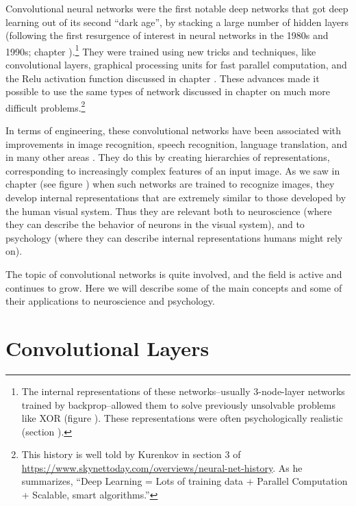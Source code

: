 Convolutional neural networks were the first notable deep networks that got deep learning out of its second ``dark age'', by stacking a large number of hidden layers (following the first resurgence of interest in neural networks in the 1980s and 1990s; chapter ).\footnote{The internal representations of these networks--usually 3-node-layer networks trained by backprop--allowed them to solve previously unsolvable problems like XOR (figure ). These representations were often psychologically realistic (section ).} They were trained using new tricks and techniques, like convolutional layers, graphical processing units for fast parallel computation, and the Relu activation function discussed in chapter . These advances made it possible to use the same types of network discussed in chapter  on much more difficult problems.\footnote{This history is well told by Kurenkov in section 3 of \url{https://www.skynettoday.com/overviews/neural-net-history}. As he summarizes, ``Deep Learning = Lots of training data + Parallel Computation + Scalable, smart algorithms.''}

In terms of engineering, these convolutional networks have been associated with improvements in image recognition, speech recognition, language translation, and in many other areas \cite{lecun2015deep, goodfellow2016deep}. They do this by creating hierarchies of representations, corresponding  to increasingly complex features of an input image. As we saw in chapter  (see figure ) when such networks are trained to recognize images, they develop internal representations that are extremely similar to those developed by the human visual  system. Thus they are relevant both to neuroscience (where they can describe the behavior of neurons in the visual system), and to psychology (where they can describe internal representations humans might rely on).

The topic of convolutional networks is quite involved, and the field is active and continues to grow. Here we will describe some of the main concepts and some of their applications to neuroscience and psychology.

\section{Convolutional Layers}\label{convolutionalLayer}

